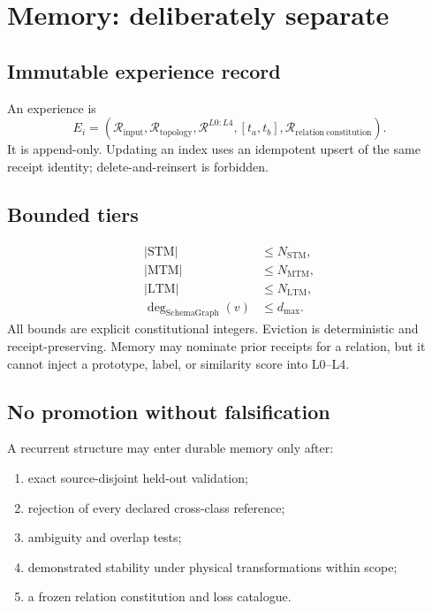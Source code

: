 \documentclass[11pt,oneside]{article}
\begin{document}
\section{Memory: deliberately separate}

\subsection{Immutable experience record}

An experience is
\[
  E_i=
  \left(
    \mathcal{R}_{\mathrm{input}},
    \mathcal{R}_{\mathrm{topology}},
    \mathcal{R}^{L0:L4},
    [t_a,t_b],
    \mathcal{R}_{\mathrm{relation\ constitution}}
  \right).
\]
It is append-only. Updating an index uses an idempotent upsert of the same
receipt identity; delete-and-reinsert is forbidden.

\subsection{Bounded tiers}

\begin{align*}
  |\mathrm{STM}|&\leq N_{\mathrm{STM}},\\
  |\mathrm{MTM}|&\leq N_{\mathrm{MTM}},\\
  |\mathrm{LTM}|&\leq N_{\mathrm{LTM}},\\
  \deg_{\mathrm{SchemaGraph}}(v)&\leq d_{\max}.
\end{align*}
All bounds are explicit constitutional integers. Eviction is deterministic
and receipt-preserving. Memory may nominate prior receipts for a relation, but
it cannot inject a prototype, label, or similarity score into L0--L4.

\subsection{No promotion without falsification}

A recurrent structure may enter durable memory only after:
\begin{enumerate}
  \item exact source-disjoint held-out validation;
  \item rejection of every declared cross-class reference;
  \item ambiguity and overlap tests;
  \item demonstrated stability under physical transformations within scope;
  \item a frozen relation constitution and loss catalogue.
\end{enumerate}
\end{document}
